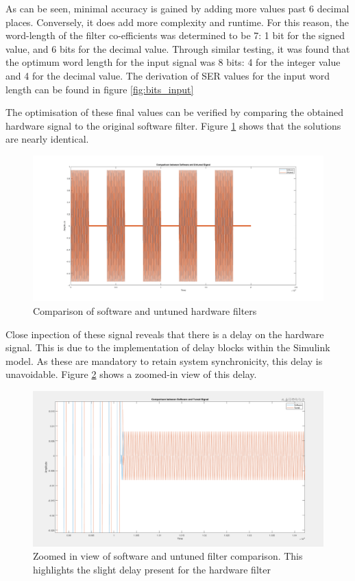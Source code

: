 \documentclass[12pt,a4paper]{article}
\begin{document}
As can be seen, minimal accuracy is gained by adding more values past 6 decimal places. Conversely, it does add more complexity and runtime. For this reason, the word-length of the filter co-efficients was determined to be 7: 1 bit for the signed value, and 6 bits for the decimal value. Through similar testing, it was found that the optimum word length for the input signal was 8 bits: 4 for the integer value and 4 for the decimal value. The derivation of SER values for the input word length can be found in figure \ref{fig:bits_input}

The optimisation of these final values can be verified by comparing the obtained hardware signal to the original software filter. Figure \ref{fig:sw_untuned} shows that the solutions are nearly identical. 

\begin{figure}[H]
    \centering
    \includegraphics[scale=0.25]{images/sw_untuned.png}
    \caption{Comparison of software and untuned hardware filters}
    \label{fig:sw_untuned}
\end{figure}

Close inpection of these signal reveals that there is a delay on the hardware signal. This is due to the implementation of delay blocks within the Simulink model. As these are mandatory to retain system synchronicity, this delay is unavoidable. Figure \ref{fig:sw_untuned_close} shows a zoomed-in view of this delay. 

\begin{figure}[H]
    \centering
    \includegraphics[scale=0.25]{images/sw_tuned_close.PNG}
    \caption{Zoomed in view of software and untuned filter comparison. This highlights the slight delay present for the hardware filter}
    \label{fig:sw_untuned_close}
\end{figure}
\end{document}
